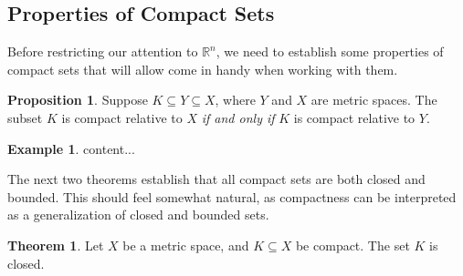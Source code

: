 \documentclass{article}
\newcommand{\R}{\mathbb{R}}
\theoremstyle{definition}
\newtheorem{proposition}{Proposition}[section]
\newtheorem{theorem}{Theorem}[section]
\newtheorem{example}{Example}[section]
\begin{document}
\subsection{Properties of Compact Sets}
Before restricting our attention to $ \R^n $, we need to establish some properties of compact sets that will allow come in handy when working with them.
\begin{proposition}
	Suppose $ K\subseteq Y\subseteq X $, where $ Y $ and $ X $ are metric spaces. The subset $ K $ is compact relative to $ X $ \textit{if and only if} $ K $ is compact relative to $ Y $.  
\end{proposition}
\begin{example}
	content...
\end{example}

The next two theorems establish that all compact sets are both closed and bounded. This should feel somewhat natural, as compactness can be interpreted as a generalization of closed and bounded sets.
\begin{theorem}
	Let $ X $ be a metric space, and $ K\subseteq X $ be compact. The set $ K $ is closed. 
\end{theorem} 
\end{document}
